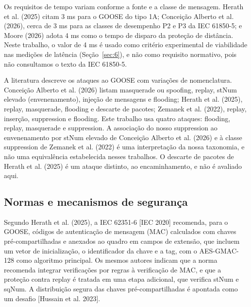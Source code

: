 \documentclass[12pt]{article}
\newcommand{\cit}[2]{[#1]\nocite{#2}}
\newcommand{\citn}[2]{#1\nocite{#2}}
\begin{document}
Os requisitos de tempo variam conforme a fonte e a classe de mensagem. \citn{Herath et al. (2025)}{herath2025evaluation} citam 3 ms para o GOOSE do tipo 1A; \citn{Conceição Alberto et al. (2026)}{alberto2026gooseidrs}, cerca de 3 ms para as classes de desempenho P2 e P3 da IEC 61850-5; e \citn{Moore (2026)}{moore2026anomaly} adota 4 ms como o tempo de disparo da proteção de distância. Neste trabalho, o valor de 4 ms é usado como critério experimental de viabilidade nas medições de latência (Seção~\ref{sec:6}), e não como requisito normativo, pois não consultamos o texto da IEC 61850-5.

A literatura descreve os ataques ao GOOSE com variações de nomenclatura. \citn{Conceição Alberto et al. (2026)}{alberto2026gooseidrs} listam masquerade ou spoofing, replay, stNum elevado (envenenamento), injeção de mensagens e flooding; \citn{Herath et al. (2025)}{herath2025evaluation}, replay, masquerade, flooding e descarte de pacotes; \citn{Zemanek et al. (2022)}{zemanek2022powerduck}, replay, inserção, suppression e flooding. Este trabalho usa quatro ataques: flooding, replay, masquerade e suppression. A associação do nosso suppression ao envenenamento por stNum elevado de \citn{Conceição Alberto et al. (2026)}{alberto2026gooseidrs} e à classe suppression de \citn{Zemanek et al. (2022)}{zemanek2022powerduck} é uma interpretação da nossa taxonomia, e não uma equivalência estabelecida nesses trabalhos. O descarte de pacotes de \citn{Herath et al. (2025)}{herath2025evaluation} é um ataque distinto, ao encaminhamento, e não é avaliado aqui.

\subsection{Normas e mecanismos de segurança}\label{sec:2.2}

Segundo \citn{Herath et al. (2025)}{herath2025evaluation}, a IEC 62351-6 \cit{IEC 2020}{iec62351-6} recomenda, para o GOOSE, códigos de autenticação de mensagem (MAC) calculados com chaves pré-compartilhadas e anexados ao quadro em campos de extensão, que incluem um vetor de inicialização, o identificador da chave e a tag, com o AES-GMAC-128 como algoritmo principal. Os mesmos autores indicam que a norma recomenda integrar verificações por regras à verificação de MAC, e que a proteção contra replay é tratada em uma etapa adicional, que verifica stNum e sqNum. A distribuição segura das chaves pré-compartilhadas é apontada como um desafio \cit{Hussain et al. 2023}{hussain2023hybrid}.
\end{document}
